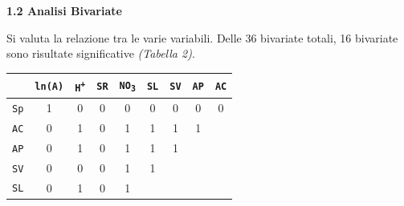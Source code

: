 \documentclass{article} %
\begin{document}
\newpage
\begin{flushleft}
    
    \textbf{\Large 1.2 \: Analisi Bivariate}
    \vskip 10pt
\end{flushleft}
\vskip 10pt

Si valuta la relazione tra le varie variabili. Delle 36 bivariate totali, 16 bivariate sono risultate significative \textit{(Tabella 2)}.\\

\begin{table}[H]
    \centering
    \renewcommand{\arraystretch}{1.4} %
    \begin{tabular}{lcccccccc}
        \toprule
        & \texttt{ln(A)} & \texttt{H\textsuperscript{+}} & \texttt{SR} & \texttt{NO\textsubscript{3}} & \texttt{SL} & \texttt{SV} & \texttt{AP} & \texttt{AC}\\
        \midrule  
            \texttt{Sp} & 1 & 0 & 0 & 0 & 0 & 0 & 0 & 0\\
            \texttt{AC} & 0 & 1 & 0 & 1 & 1 & 1 & 1 \\
            \texttt{AP} & 0 & 1 & 0 & 1 & 1 & 1 &  \\
            \texttt{SV} & 0 & 0 & 0 & 1 & 1 &  &  \\
            \texttt{SL} & 0 & 1 & 0 & 1 &  &  &  \\

\end{tabular}
\end{table}
\end{document}
